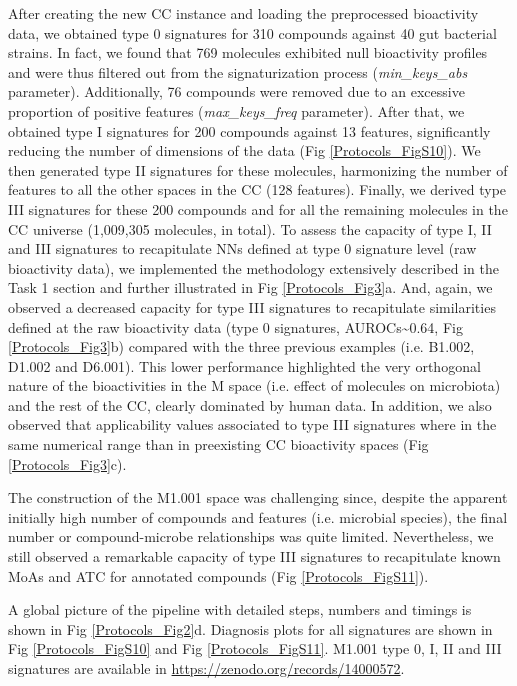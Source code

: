After creating the new CC instance and loading the preprocessed bioactivity data, we obtained type 0 signatures for 310 compounds against 40 gut bacterial strains. In fact, we found that 769 molecules exhibited null bioactivity profiles and were thus filtered out from the signaturization process (\textit{min\_keys\_abs} parameter). Additionally, 76 compounds were removed due to an excessive proportion of positive features (\textit{max\_keys\_freq} parameter). After that, we obtained type I signatures for 200 compounds against 13 features, significantly reducing the number of dimensions of the data (Fig \ref{Protocols_FigS10}). We then generated type II signatures for these molecules, harmonizing the number of features to all the other spaces in the CC (128 features). Finally, we derived type III signatures for these 200 compounds and for all the remaining molecules in the CC universe (1,009,305 molecules, in total). To assess the capacity of type I, II and III signatures to recapitulate NNs defined at type 0 signature level (raw bioactivity data), we implemented the methodology extensively described in the Task 1 section and further illustrated in Fig \ref{Protocols_Fig3}a. And, again, we observed a decreased capacity for type III signatures to recapitulate similarities defined at the raw bioactivity data (type 0 signatures, AUROCs\textasciitilde0.64, Fig \ref{Protocols_Fig3}b) compared with the three previous examples (i.e. B1.002, D1.002 and D6.001). This lower performance highlighted the very orthogonal nature of the bioactivities in the M space (i.e. effect of molecules on microbiota) and the rest of the CC, clearly dominated by human data. In addition, we also observed that applicability values associated to type III signatures where in the same numerical range than in preexisting CC bioactivity spaces (Fig \ref{Protocols_Fig3}c).

The construction of the M1.001 space was challenging since, despite the apparent initially high number of compounds and features (i.e. microbial species), the final number or compound-microbe relationships was quite limited. Nevertheless, we still observed a remarkable capacity of type III signatures to recapitulate known MoAs and ATC for annotated compounds (Fig \ref{Protocols_FigS11}).

A global picture of the pipeline with detailed steps, numbers and timings is shown in Fig \ref{Protocols_Fig2}d. Diagnosis plots for all signatures are shown in Fig \ref{Protocols_FigS10} and Fig \ref{Protocols_FigS11}. M1.001 type 0, I, II and III signatures are available in \hyperlink{https://zenodo.org/records/14000572}{https://zenodo.org/records/14000572}. 

